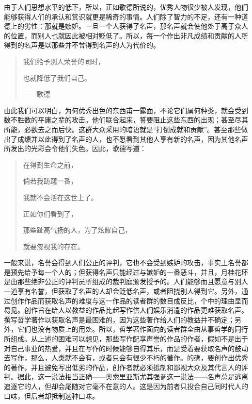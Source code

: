 \documentclass[12pt,oneside]{book}
\begin{document}
由于人们思想水平的低下，所以，正如歌德所说的，优秀人物很少被人发现，他们能够获得人们的承认和赏识就更是稀奇的事情。人们除了智力的不足，还有一种道德上的劣性：那就是嫉妒。一旦一个人获得了名声，那名声就会使他处于高于众人的位置，而别人也就因此被相对贬低了。所以，每一个作出非凡成绩和贡献的人所得到的名声是以那些并不曾得到名声的人为代价的。 

 
\begin{quotation}
我们给予别人荣誉的同时， 

也就降低了我们自己。 

——歌德 
\end{quotation}


由此我们可以明白，为何优秀出色的东西甫一露面，不论它们属何种类，就会受到数不胜数的平庸之辈的攻击。他们联合起来，誓要阻止这些东西的出现；甚至尽其所能，必欲去之而后快。这群大众采用的暗语就是“打倒成就和贡献”。甚至那些做出了成绩并以此得到了名声的人，也不愿看到其他人享有新的名声，因为其他名声所发出的光彩会令他们失色。因此，歌德写道： 

 
\begin{quotation}
在得到生命之前， 

倘若我踌躇一番， 

我就不会活在这世上了。 

正如你们看到了， 

那些趾高气扬的人，为了炫耀自己， 

就要忽视我的存在。 
\end{quotation}


一般来说，名誉会得到人们公正的评判，它也不会受到嫉妒的攻击，事实上名誉都是预先给予每一个人的；但获得名声只能经过与嫉妒的一番恶斗，并且，月桂花环是由那些绝非公正的评判员所组成的裁判庭颁发授予的。人们能够而且愿意与别人一道享有名誉，但获取了名声的人却会贬低名声，或者阻挠别人得到它。另外，通过创作作品而获取名声的难度与这一作品的读者群的数目成反比，个中的理由显而易见。创作旨在给人以教益的作品比起写作供人们娱乐消遣的作品更难获取名声。撰写哲学著作以获取名声是最困难的，因为这些著作给人们的教益并不确定；另外，它们也没有物质上的用处。所以，哲学著作面向的读者群全由从事哲学的同行所组成。从上述的困难可以想见，那些写作配享声誉的作品的作者，假如不是出于对自己事业的热爱，并且在写作的时候能够自得其乐，而是受着要获取名声的鼓动去写作，那么，人类就不会有，或者只会有很少不朽的著作。的确，要创作出优秀的著作，并且避免写出低劣的作品，创作者就必须抵制和鄙视大众及其代言人的评判。据此，这一说法相当正确——奥索里亚斯尤其强调这一说法——名声总是逃离追逐它的人，但却会尾随对它毫不在意的人。这是因为前者只投合自己同时代人的口味，但后者却抵制这种口味。 
\end{document}
